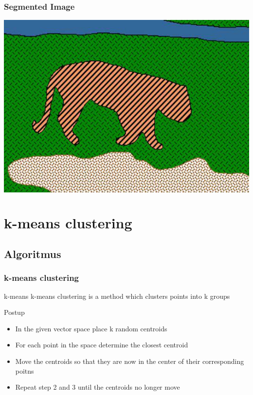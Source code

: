 \documentclass{beamer}
\begin{document}
\begin{frame}
\frametitle{Segmented Image}
\includegraphics[width=\textwidth]{tiger_segmented.png}
\end{frame}



\section{k-means clustering}

\subsection{Algoritmus}

\begin{frame}
\frametitle{k-means clustering}

\begin{block}{k-means}
k-means clustering is a method which clusters points into k groups
\end{block}

\begin{block}{Postup}
\begin{itemize}
\item In the given vector space place k random centroids
\item For each point in the space determine the closest centroid
\item Move the centroids so that they are now in the center of their corresponding poitns
\item Repeat step 2 and 3 until the centroids no longer move
\end{itemize}
\end{block}
\end{frame}
\end{document}
